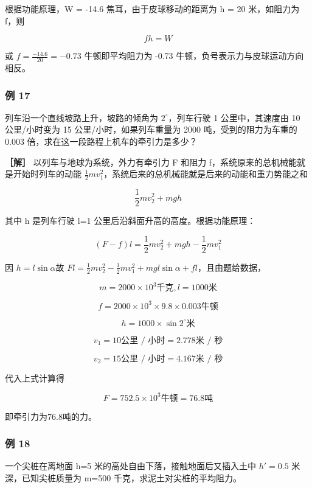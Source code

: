 根据功能原理，W = -14.6 焦耳，由于皮球移动的距离为 h = 20 米，如阻力为
f，则

\[
f h = W
\]

或 \(f = \frac{-14.6}{20} = -0.73\) 牛顿即平均阻力为 -0.73
牛顿，负号表示力与皮球运动方向相反。

\subsubsection{例 17}\label{ux4f8b-17-1}

列车沿一个直线坡路上升，坡路的倾角为 \(2^{\circ}\)，列车行驶 1
公里中，其速度由 10 公里/小时变为 15 公里/小时，如果列车重量为 2000
吨，受到的阻力为车重的 0.003 倍，求在这一段路程上机车的牵引力是多少？

\textbf{［解］} 以列车与地球为系统，外力有牵引力 F 和阻力
f，系统原来的总机械能就是开始时列车的动能
\(\frac{1}{2}mv_{1}^{2}\)，系统后来的总机械能就是后来的动能和重力势能之和

\[
\frac {1}{2} m v _ {2} ^ {2} + m g h
\]

其中 h 是列车行驶 l=1 公里后沿斜面升高的高度。根据功能原理：

\[
(F - f) l = \frac {1}{2} m v _ {2} ^ {2} + m g h - \frac {1}{2} m v _ {1} ^ {2}
\]

因 \(h = l\sin \alpha\)故
\(Fl = \frac{1}{2} mv_2^2 -\frac{1}{2} mv_1^2 +mgl\sin \alpha +fl\)，且由题给数据，

\[
m = 2000 \times 10 ^ {3} \text{千克}, l = 1000 \text{米}
\]

\[
f = 2000 \times 10 ^ {3} \times 9.8 \times 0.003 \text{牛顿}
\]

\[
h = 1000 \times \sin 2 ^ {\circ} \text{米}
\]

\[
v _ {1} = 10 \text{公里 / 小时} = 2.778 \text{米 / 秒}
\]

\[
v _ {2} = 15 \text{公里 / 小时} = 4.167 \text{米 / 秒}
\]

代入上式计算得

\[
F = 752.5 \times 10 ^ {3} \text{牛顿} = 76.8 \text{吨}
\]

即牵引力为76.8吨的力。

\subsubsection{例 18}\label{ux4f8b-18}

一个尖桩在离地面 h=5 米的高处自由下落，接触地面后又插入土中 \(h'=0.5\)
米深，已知尖桩质量为 m=500 千克，求泥土对尖桩的平均阻力。

